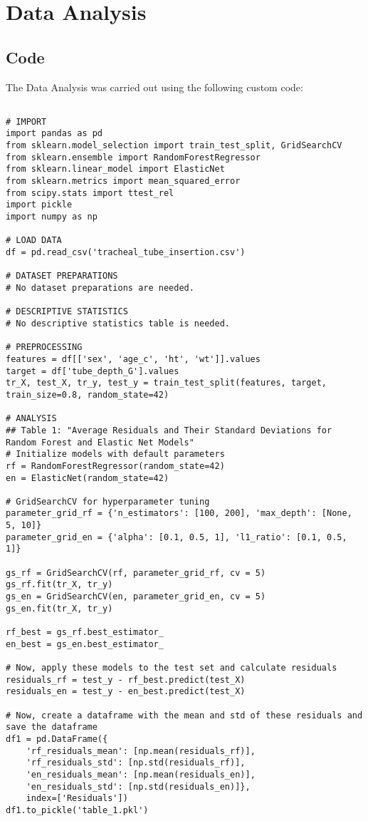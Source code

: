 \documentclass[11pt]{article}
\begin{document}
\section{Data Analysis}
\subsection{{Code}}
The Data Analysis was carried out using the following custom code:

\begin{verbatim}

# IMPORT
import pandas as pd
from sklearn.model_selection import train_test_split, GridSearchCV
from sklearn.ensemble import RandomForestRegressor
from sklearn.linear_model import ElasticNet
from sklearn.metrics import mean_squared_error
from scipy.stats import ttest_rel
import pickle
import numpy as np

# LOAD DATA
df = pd.read_csv('tracheal_tube_insertion.csv')

# DATASET PREPARATIONS
# No dataset preparations are needed.

# DESCRIPTIVE STATISTICS
# No descriptive statistics table is needed.

# PREPROCESSING
features = df[['sex', 'age_c', 'ht', 'wt']].values
target = df['tube_depth_G'].values
tr_X, test_X, tr_y, test_y = train_test_split(features, target, train_size=0.8, random_state=42)

# ANALYSIS
## Table 1: "Average Residuals and Their Standard Deviations for Random Forest and Elastic Net Models"
# Initialize models with default parameters
rf = RandomForestRegressor(random_state=42)
en = ElasticNet(random_state=42)

# GridSearchCV for hyperparameter tuning
parameter_grid_rf = {'n_estimators': [100, 200], 'max_depth': [None, 5, 10]}
parameter_grid_en = {'alpha': [0.1, 0.5, 1], 'l1_ratio': [0.1, 0.5, 1]}

gs_rf = GridSearchCV(rf, parameter_grid_rf, cv = 5)
gs_rf.fit(tr_X, tr_y)
gs_en = GridSearchCV(en, parameter_grid_en, cv = 5)
gs_en.fit(tr_X, tr_y)

rf_best = gs_rf.best_estimator_
en_best = gs_en.best_estimator_

# Now, apply these models to the test set and calculate residuals
residuals_rf = test_y - rf_best.predict(test_X)
residuals_en = test_y - en_best.predict(test_X)

# Now, create a dataframe with the mean and std of these residuals and save the dataframe
df1 = pd.DataFrame({
    'rf_residuals_mean': [np.mean(residuals_rf)], 
    'rf_residuals_std': [np.std(residuals_rf)],
    'en_residuals_mean': [np.mean(residuals_en)], 
    'en_residuals_std': [np.std(residuals_en)]}, 
    index=['Residuals'])
df1.to_pickle('table_1.pkl')


\end{verbatim}
\end{document}

